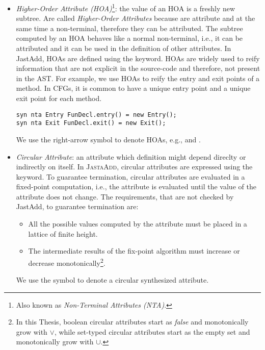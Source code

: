 \begin{itemize}
    \item \emph{Higher-Order Attribute (HOA)}\footnote{Also known as \emph{Non-Terminal Attributes (NTA)}.}:
    the value of an HOA is a freshly new subtree. Are called \emph{Higher-Order Attributes}
    because are attribute and at the same time a non-terminal, therefore they can be attributed.
    The subtree computed by an HOA behaves like a normal non-terminal, i.e., it can be
    attributed and it can be used in the definition of other attributes. In JastAdd, HOAs
    are defined using the  keyword. HOAs are widely used to reify information
    that are not explicit in the source-code and therefore, not present in the AST.
    For example, we use HOAs to reify the entry and exit points of a method. In CFGs, it
    is common to have a unique entry point and a unique exit point for each method.
    \begin{lstlisting}[language=JastAdd]
syn nta Entry FunDecl.entry() = new Entry();
syn nta Exit FunDecl.exit() = new Exit();
    \end{lstlisting}
    We use the right-arrow symbol to denote HOAs, e.g.,   and .
    \item \emph{Circular Attribute}: an attribute which definition might depend direclty
    or indirectly on itself. In \textsc{JastaAdd}, circular attributes are expressed using the 
    keyword. To guarantee termination, circular attributes are evaluated in a fixed-point
    computation, i.e., the attribute is evaluated until the value of the attribute does not change.
    The requirements, that are not checked by JastAdd, to guarantee termination are:
    \begin{itemize}
        \item All the possible values computed by the attribute must be placed
        in a lattice of finite height.
        \item The intermediate results of the fix-point algorithm must increase
        or decrease monotonically\footnote{In this Thesis, boolean circular attributes start
        as \emph{false} and monotonically grow with $\vee$, while set-typed circular attributes
        start as the empty set and monotonically grow with $\cup$.}.
    \end{itemize}
    We use the symbol  to denote a circular synthesized attribute.


\end{itemize}
